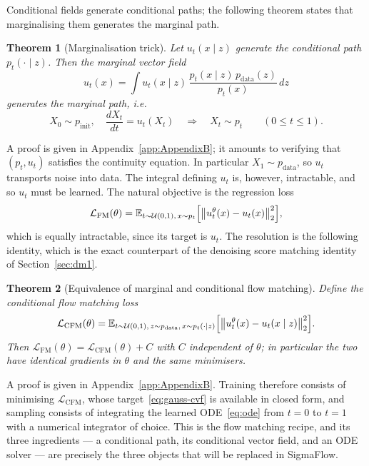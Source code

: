 \documentclass[a4paper,12pt]{article}
\newtheorem{theorem}{Theorem}[section]
\theoremstyle{remark}
\begin{document}
Conditional fields generate conditional paths; the following theorem states that
marginalising them generates the marginal path.

\begin{theorem}[Marginalisation trick]
\label{thm:MarginalizationTrick}
Let $u_t(x\mid z)$ generate the conditional path $p_t(\cdot\mid z)$. Then the marginal
vector field
\[
u_t(x)
=
\int u_t(x\mid z)\,\frac{p_t(x\mid z)\,p_{\mathrm{data}}(z)}{p_t(x)}\,dz
\]
generates the marginal path, i.e.
\[
X_0\sim p_{\mathrm{init}},
\quad
\frac{dX_t}{dt}=u_t(X_t)
\quad\Longrightarrow\quad
X_t\sim p_t
\qquad (0\le t\le1).
\]
\end{theorem}

A proof is given in Appendix~\ref{app:AppendixB}; it amounts to verifying that $(p_t,u_t)$
satisfies the continuity equation. In particular $X_1\sim p_{\mathrm{data}}$, so $u_t$
transports noise into data. The integral defining $u_t$ is, however, intractable, and so
$u_t$ must be learned. The natural objective is the regression loss
\[
\mathcal L_{\mathrm{FM}}(\theta)
=
\mathbb E_{t\sim\mathcal U(0,1),\,x\sim p_t}
\Bigl[
\bigl\|u_t^\theta(x)-u_t(x)\bigr\|_2^2
\Bigr],
\]
which is equally intractable, since its target is $u_t$. The resolution is the
following identity, which is the exact counterpart of the denoising score matching
identity of Section~\ref{sec:dm1}.

\begin{theorem}[Equivalence of marginal and conditional flow matching]
\label{thm:cfm_equivalence}
Define the conditional flow matching loss
\[
\mathcal L_{\mathrm{CFM}}(\theta)
=
\mathbb E_{t\sim\mathcal U(0,1),\,z\sim p_{\mathrm{data}},\,x\sim p_t(\cdot\mid z)}
\Bigl[
\bigl\|
u_t^\theta(x)-u_t(x\mid z)
\bigr\|_2^2
\Bigr].
\]
Then $\mathcal L_{\mathrm{FM}}(\theta)=\mathcal L_{\mathrm{CFM}}(\theta)+C$ with $C$
independent of $\theta$; in particular the two have identical gradients in $\theta$ and
the same minimisers.
\end{theorem}

A proof is given in Appendix~\ref{app:AppendixB}. Training therefore consists of
minimising $\mathcal L_{\mathrm{CFM}}$, whose target~\eqref{eq:gauss-cvf} is available
in closed form, and sampling consists of integrating the learned ODE~\eqref{eq:ode}
from $t=0$ to $t=1$ with a numerical integrator of choice. This is the flow matching
recipe, and its three ingredients --- a conditional path, its conditional vector field,
and an ODE solver --- are precisely the three objects that will be replaced in
SigmaFlow.
\end{document}
